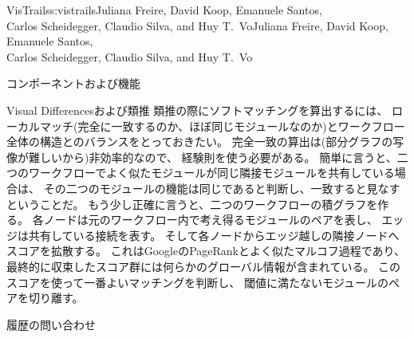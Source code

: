 \begin{aosachaptertoc}{VisTrails}{s:vistrails}{Juliana Freire, David Koop, Emanuele Santos, \\ Carlos Scheidegger, Claudio Silva, and Huy T.\ Vo}{Juliana Freire, David Koop, Emanuele Santos, \\ \hspace*{0.9cm} Carlos Scheidegger, Claudio Silva, and Huy T.\ Vo}
\begin{aosasect1}{コンポーネントおよび機能}
\begin{aosasect2}{Visual Differencesおよび類推}
類推の際にソフトマッチングを算出するには、
ローカルマッチ(完全に一致するのか、ほぼ同じモジュールなのか)とワークフロー全体の構造とのバランスをとっておきたい。
完全一致の算出は(部分グラフの写像が難しいから)非効率的なので、
経験則を使う必要がある。
簡単に言うと、二つのワークフローでよく似たモジュールが同じ隣接モジュールを共有している場合は、
その二つのモジュールの機能は同じであると判断し、一致すると見なすということだ。
もう少し正確に言うと、二つのワークフローの積グラフを作る。
各ノードは元のワークフロー内で考え得るモジュールのペアを表し、
エッジは共有している接続を表す。
そして各ノードからエッジ越しの隣接ノードへスコアを拡散する。
これはGoogleのPageRankとよく似たマルコフ過程であり、
最終的に収束したスコア群には何らかのグローバル情報が含まれている。
このスコアを使って一番よいマッチングを判断し、
閾値に満たないモジュールのペアを切り離す。

\end{aosasect2}

\begin{aosasect2}{履歴の問い合わせ}


\end{aosasect2}
\end{aosasect1}
\end{aosachaptertoc}

